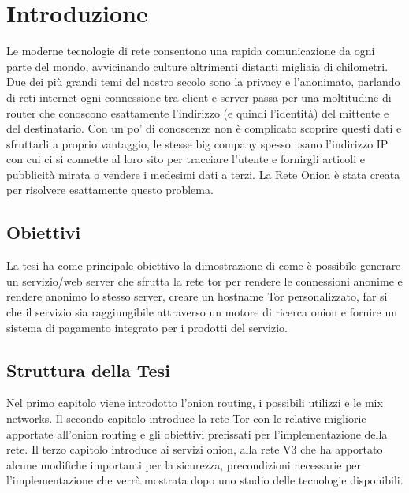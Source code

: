 \chapter{Introduzione}
\label{chap:intro}

Le moderne tecnologie di rete consentono una rapida comunicazione da ogni parte del mondo, avvicinando culture altrimenti distanti migliaia di chilometri. Due dei più grandi temi del nostro secolo sono la privacy e l'anonimato, parlando di reti internet ogni connessione tra client e server passa per una moltitudine di router che conoscono esattamente l'indirizzo (e quindi l'identità) del mittente e del destinatario. Con un po' di conoscenze non è complicato scoprire questi dati e sfruttarli a proprio vantaggio, le stesse big company spesso usano l'indirizzo IP con cui ci si connette al loro sito per tracciare l'utente e fornirgli articoli e pubblicità mirata o vendere i medesimi dati a terzi. 
La Rete Onion è stata creata per risolvere esattamente questo problema.

\section{Obiettivi}

La tesi ha come principale obiettivo la dimostrazione di come è possibile generare un servizio/web server che sfrutta la rete tor per rendere le connessioni anonime e rendere anonimo lo stesso server, creare un hostname Tor personalizzato, far si che il servizio sia raggiungibile attraverso un motore di ricerca onion e fornire un sistema di pagamento integrato per i prodotti del servizio.

\section{Struttura della Tesi}
Nel primo capitolo viene introdotto l'onion routing, i possibili utilizzi e le mix networks. 
Il secondo capitolo introduce la rete Tor con le relative migliorie apportate all'onion routing e gli obiettivi prefissati per l'implementazione della rete.
Il terzo capitolo introduce ai servizi onion, alla rete V3 che ha apportato alcune modifiche importanti per la sicurezza, precondizioni necessarie per l'implementazione che verrà mostrata dopo uno studio delle tecnologie disponibili.
